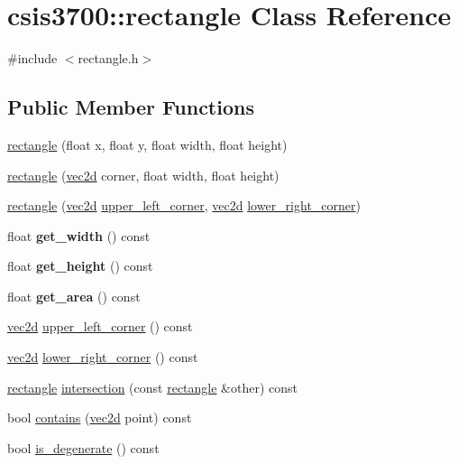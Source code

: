 \hypertarget{classcsis3700_1_1rectangle}{}\section{csis3700\+:\+:rectangle Class Reference}
\label{classcsis3700_1_1rectangle}


{\ttfamily \#include $<$rectangle.\+h$>$}

\subsection*{Public Member Functions}
\begin{DoxyCompactItemize}
\item 
\hyperlink{classcsis3700_1_1rectangle_a12769987479c35eb82d4c327c5af31fb}{rectangle} (float x, float y, float width, float height)
\item 
\hyperlink{classcsis3700_1_1rectangle_a343355b4f013ac440b155d634ebc1c5c}{rectangle} (\hyperlink{classcsis3700_1_1vec2d}{vec2d} corner, float width, float height)
\item 
\hyperlink{classcsis3700_1_1rectangle_a65e217f0a67f76c2014b34f5995c689d}{rectangle} (\hyperlink{classcsis3700_1_1vec2d}{vec2d} \hyperlink{classcsis3700_1_1rectangle_a8d1b0714f3e711e5aaa6b708d358b945}{upper\+\_\+left\+\_\+corner}, \hyperlink{classcsis3700_1_1vec2d}{vec2d} \hyperlink{classcsis3700_1_1rectangle_af54b1619b62550375df6a272b25c96b6}{lower\+\_\+right\+\_\+corner})
\item 
\mbox{\label{classcsis3700_1_1rectangle_acf6f6686418d6c645704cadee57d6e83}} 
float {\bfseries get\+\_\+width} () const
\item 
\mbox{\label{classcsis3700_1_1rectangle_a019b442975cc327d4693c214edfe15c4}} 
float {\bfseries get\+\_\+height} () const
\item 
\mbox{\label{classcsis3700_1_1rectangle_ab8a18ef5682e35b877600c3051d580c2}} 
float {\bfseries get\+\_\+area} () const
\item 
\hyperlink{classcsis3700_1_1vec2d}{vec2d} \hyperlink{classcsis3700_1_1rectangle_a8d1b0714f3e711e5aaa6b708d358b945}{upper\+\_\+left\+\_\+corner} () const
\item 
\hyperlink{classcsis3700_1_1vec2d}{vec2d} \hyperlink{classcsis3700_1_1rectangle_af54b1619b62550375df6a272b25c96b6}{lower\+\_\+right\+\_\+corner} () const
\item 
\hyperlink{classcsis3700_1_1rectangle}{rectangle} \hyperlink{classcsis3700_1_1rectangle_ae6306167ac675bdf07cf3a834f1148ae}{intersection} (const \hyperlink{classcsis3700_1_1rectangle}{rectangle} \&other) const
\item 
bool \hyperlink{classcsis3700_1_1rectangle_a15d2ad3f67159bd7724a3728203b1f29}{contains} (\hyperlink{classcsis3700_1_1vec2d}{vec2d} point) const
\item 
bool \hyperlink{classcsis3700_1_1rectangle_a8d897bc040bd296de7206a0576189dc6}{is\+\_\+degenerate} () const
\end{DoxyCompactItemize}


